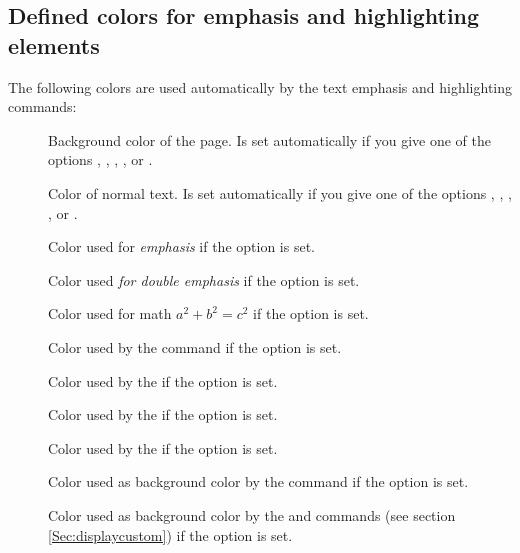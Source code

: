   \subsection{Defined colors for emphasis and highlighting elements}\label{Sec:Colors}
  The following colors are used automatically by the text emphasis and highlighting commands:
  \begin{description}
  \item[] Background color of the page. Is set automatically if you give one of the
    options , , , , or
    .

  \item[] Color of normal text. Is set automatically if you give one of the options
    , , , , or
    .

  \item[] Color used for \emph{emphasis} if the  option is set.
    
  \item[] Color used \emph{for \emph{double} emphasis} if the  option
    is set.
    
  \item[] Color used for math $a^2+b^2=c^2$ if the  option is set.

  \item[] Color used by the  command if the 
    option is set.
    
  \item[] Color used by the  if the
     option is set.
    
  \item[] Color used by the  if the
     option is set.
    
    \newslide

  \item[] Color used by the  if the
     option is set.
    
  \item[] Color used as background color by the 
    command if the  option is set.
    
  \item[] Color used as background color by the
     and  commands (see section
    \ref{Sec:displaycustom}) if the  option is set.
  \end{description}

